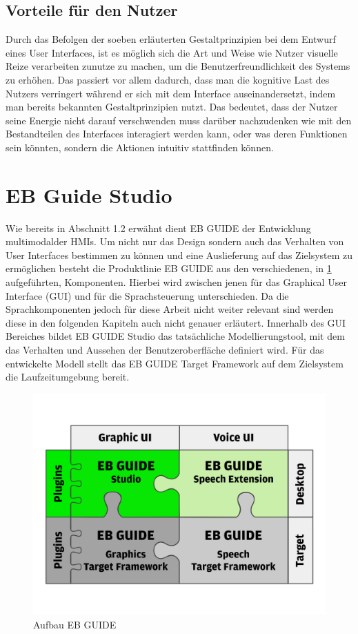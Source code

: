 \subsection*{Vorteile für den Nutzer}
Durch das Befolgen der soeben erläuterten Gestaltprinzipien bei dem Entwurf eines User Interfaces, ist es möglich sich die Art und Weise wie Nutzer visuelle Reize verarbeiten zunutze zu machen, um die Benutzerfreundlichkeit des Systems zu erhöhen.
Das passiert vor allem dadurch, dass man die kognitive Last des Nutzers verringert während er sich mit dem Interface auseinandersetzt, indem man bereits bekannten Gestaltprinzipien nutzt.
Das bedeutet, dass der Nutzer seine Energie nicht darauf verschwenden muss darüber nachzudenken wie mit den Bestandteilen des Interfaces interagiert werden kann, oder was deren Funktionen sein könnten, sondern die Aktionen intuitiv stattfinden können\cite{Knight.2019c}.

\section{EB Guide Studio}
Wie bereits in Abschnitt 1.2 erwähnt dient EB GUIDE der Entwicklung multimodalder HMIs.
Um nicht nur das Design sondern auch das Verhalten von User Interfaces bestimmen zu können und eine Auslieferung auf das Zielsystem zu ermöglichen besteht die Produktlinie EB GUIDE aus den verschiedenen, in \cref{fig:guide_puzzle} aufgeführten, Komponenten.
Hierbei wird zwischen jenen für das Graphical User Interface (GUI) und  für die Sprachsteuerung unterschieden.
Da die Sprachkomponenten jedoch für diese Arbeit nicht weiter relevant sind werden diese in den folgenden Kapiteln auch nicht genauer erläutert.
Innerhalb des GUI Bereiches bildet EB GUIDE Studio das tatsächliche Modellierungstool, mit dem das Verhalten und Aussehen der Benutzeroberfläche definiert wird.
Für das entwickelte Modell stellt das EB GUIDE Target Framework auf dem Zielsystem die Laufzeitumgebung bereit.\cite{.c}

\begin{figure} [H]
\begin{center}
  \includegraphics[scale=0.6]{figures/EB_GUIDE_Puzzle.png}
  \caption{Aufbau EB GUIDE}
  \label{fig:guide_puzzle}
\end{center}
\end{figure}

